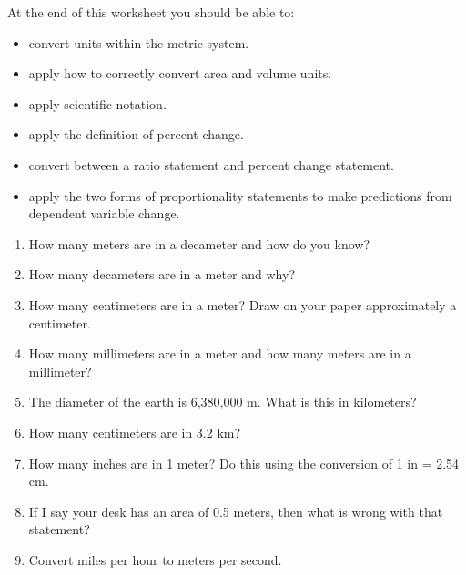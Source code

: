 At the end of this worksheet you should be able to:
\begin{itemize}
	\item convert units within the metric system.
	\item apply how to correctly convert area and volume units.
	\item apply scientific notation.
	\item apply the definition of percent change.
	\item convert between a ratio statement and percent change statement.
	\item apply the two forms of proportionality statements to make predictions from dependent variable change. 
\end{itemize}


\begin{enumerate}
\setlength\itemsep{1 in}

\item
How many meters are in a decameter and how do you know?\\
	
\item
How many decameters are in a meter and why?\\

\item 
How many centimeters are in a meter? Draw on your paper approximately a centimeter.\\

\item 
How many millimeters are in a meter and how many meters are in a millimeter?\\

\item 
The diameter of the earth is 6,380,000 m. What is this in kilometers?\\

\item 
How many centimeters are in 3.2 km?\\

\item 
How many inches are in 1 meter? Do this using the conversion of 1 in = 2.54 cm.\\

\item 
If I say your desk has an area of 0.5 meters, then what is wrong with that statement?\\

\item 
Convert miles per hour to meters per second.\\
\\



\end{enumerate}
